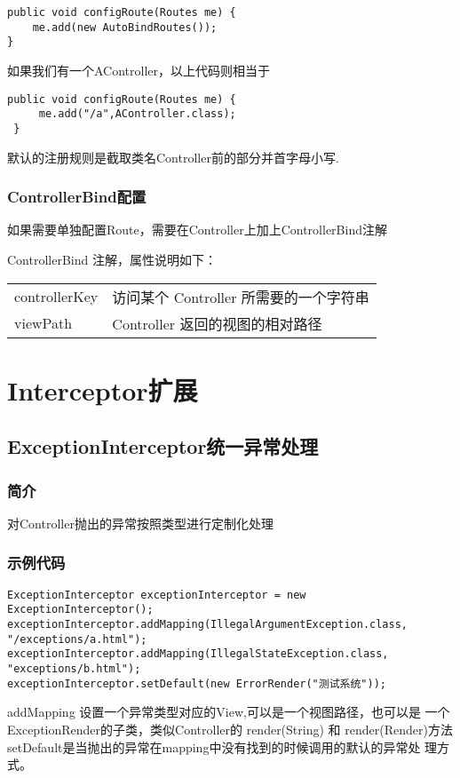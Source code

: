 \documentclass{scrartcl}
\begin{document}
\begin{verbatim}
public void configRoute(Routes me) {
    me.add(new AutoBindRoutes());
}
\end{verbatim}
    如果我们有一个AController，以上代码则相当于

\begin{verbatim}
public void configRoute(Routes me) {
     me.add("/a",AController.class);
 }
\end{verbatim}
    默认的注册规则是截取类名Controller前的部分并首字母小写.
\subsubsection{ControllerBind配置}
\label{sec-4-1-3}

    如果需要单独配置Route，需要在Controller上加上ControllerBind注解

    ControllerBind 注解，属性说明如下：

\begin{tabular}{ll}
 controllerKey  &  访问某个 Controller 所需要的一个字符串  \\
 viewPath       &  Controller 返回的视图的相对路径         \\
\end{tabular}


  
\section{Interceptor扩展}
\label{sec-5}
\subsection{ExceptionInterceptor统一异常处理}
\label{sec-5-1}
\subsubsection{简介}
\label{sec-5-1-1}

    对Controller抛出的异常按照类型进行定制化处理
\subsubsection{示例代码}
\label{sec-5-1-2}


\begin{verbatim}
ExceptionInterceptor exceptionInterceptor = new ExceptionInterceptor();
exceptionInterceptor.addMapping(IllegalArgumentException.class, "/exceptions/a.html");
exceptionInterceptor.addMapping(IllegalStateException.class, "exceptions/b.html");
exceptionInterceptor.setDefault(new ErrorRender("测试系统"));
\end{verbatim}
   addMapping 设置一个异常类型对应的View,可以是一个视图路径，也可以是
   一个ExceptionRender的子类，类似Controller的 render(String) 和
   render(Render)方法
   setDefault是当抛出的异常在mapping中没有找到的时候调用的默认的异常处
   理方式。
\end{document}
